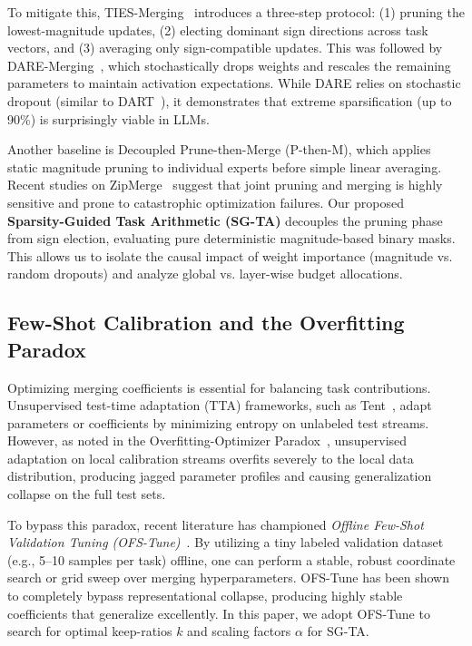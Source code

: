 To mitigate this, TIES-Merging~\cite{yadav2023ties} introduces a three-step protocol: (1) pruning the lowest-magnitude updates, (2) electing dominant sign directions across task vectors, and (3) averaging only sign-compatible updates. This was followed by DARE-Merging~\cite{yu2023language}, which stochastically drops weights and rescales the remaining parameters to maintain activation expectations. While DARE relies on stochastic dropout (similar to DART~\cite{yu2023language}), it demonstrates that extreme sparsification (up to 90\%) is surprisingly viable in LLMs.

Another baseline is Decoupled Prune-then-Merge (P-then-M), which applies static magnitude pruning to individual experts before simple linear averaging. Recent studies on ZipMerge~\cite{stoica2023zipit} suggest that joint pruning and merging is highly sensitive and prone to catastrophic optimization failures. Our proposed \textbf{Sparsity-Guided Task Arithmetic (SG-TA)} decouples the pruning phase from sign election, evaluating pure deterministic magnitude-based binary masks. This allows us to isolate the causal impact of weight importance (magnitude vs. random dropouts) and analyze global vs. layer-wise budget allocations.

\subsection{Few-Shot Calibration and the Overfitting Paradox}
Optimizing merging coefficients is essential for balancing task contributions. Unsupervised test-time adaptation (TTA) frameworks, such as Tent~\cite{wang2020tent}, adapt parameters or coefficients by minimizing entropy on unlabeled test streams. However, as noted in the Overfitting-Optimizer Paradox~\cite{liao2021are}, unsupervised adaptation on local calibration streams overfits severely to the local data distribution, producing jagged parameter profiles and causing generalization collapse on the full test sets.

To bypass this paradox, recent literature has championed \emph{Offline Few-Shot Validation Tuning (OFS-Tune)}~\cite{regcalmerge}. By utilizing a tiny labeled validation dataset (e.g., 5--10 samples per task) offline, one can perform a stable, robust coordinate search or grid sweep over merging hyperparameters. OFS-Tune has been shown to completely bypass representational collapse, producing highly stable coefficients that generalize excellently. In this paper, we adopt OFS-Tune to search for optimal keep-ratios $k$ and scaling factors $\alpha$ for SG-TA.

